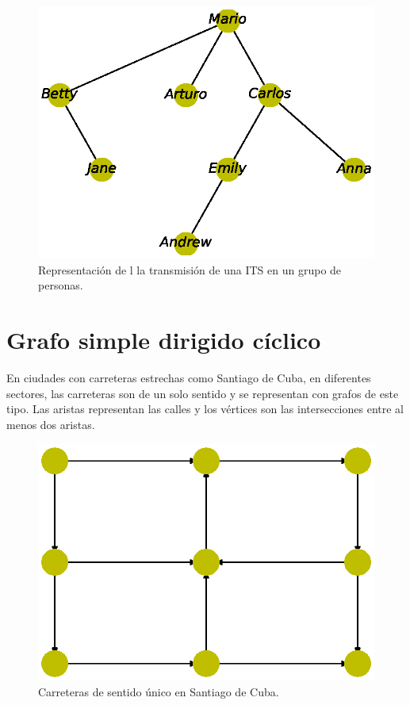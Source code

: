 \documentclass{article}
\begin{document}

\begin{figure}
  \includegraphics[width=.8\columnwidth]{4.eps}
  \caption{Representación de l la transmisión de una ITS en un grupo de personas.}
  \label{fig:4}
\end{figure}

\section{Grafo simple dirigido cíclico}

En ciudades con carreteras estrechas como Santiago de Cuba, en diferentes sectores, las carreteras son de un solo sentido y se representan con grafos de este tipo. Las aristas representan las calles y los vértices son las intersecciones entre al menos dos aristas.


\begin{figure}
  \includegraphics[width=.8\columnwidth]{5.eps}
  \caption{Carreteras de sentido único en Santiago de Cuba.}
  \label{fig:5}
\end{figure}
\newpage
\end{document}
